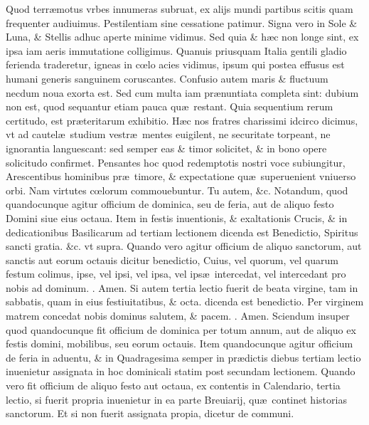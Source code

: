 \documentclass[a5paper,10pt]{book}
\def\ae{æ}
\def\oe{œ}
\begin{document}
\begin{multicols*}{2}
Quod terr\ae motus vrbes innumeras subruat, ex alijs mundi partibus scitis quam frequenter audiuimus.
Pestilentiam sine cessatione patimur.
Signa vero in Sole \& Luna, \& Stellis adhuc aperte minime vidimus.
Sed quia \& h\ae c non longe sint, ex ipsa iam aeris immutatione colligimus.
Quanuis priusquam Italia gentili gladio ferienda traderetur, igneas in c\oe lo acies vidimus, ipsum qui postea effusus est humani generis sanguinem coruscantes.
Confusio autem maris \& fluctuum necdum noua exorta est.
Sed cum multa iam pr\ae nuntiata completa sint: dubium non est, quod sequantur etiam pauca qu\ae \ restant.
Quia sequentium rerum certitudo, est pr\ae teritarum exhibitio.
H\ae c nos fratres charissimi idcirco dicimus, vt ad cautel\ae \ studium vestr\ae \ mentes euigilent, ne securitate torpeant, ne ignorantia languescant: sed semper eas \& timor solicitet, \& in bono opere solicitudo confirmet.
Pensantes hoc quod redemptotis nostri voce subiungitur, Arescentibus hominibus pr\ae \ timore, \& expectatione qu\ae \ superuenient vniuerso orbi.
Nam virtutes c\oe lorum commouebuntur.
Tu autem, \&c.
\newline {} \color{red} Notandum, quod quandocunque agitur officium de dominica, seu de feria, aut de aliquo festo Domini siue eius octaua. \color{black}
\newline {} \color{red} Item in festis inuentionis, \& exaltationis Crucis, \& in dedicationibus Basilicarum ad tertiam lectionem dicenda est Benedictio, \color{black} Spiritus sancti gratia. \color{red} \&c. vt supra. Quando vero agitur officium de aliquo sanctorum, aut sanctis aut eorum octauis dicitur benedictio, \color{black} Cuius, \color{red} vel \color{black} quorum, \color{red} vel \color{black} quarum festum colimus, ipse, \color{red} vel \color{black} ipsi, \color{red} vel \color{black} ipsa, \color{red} vel \color{black} ips\ae \ intercedat, \color{red} vel \color{black} intercedant pro nobis ad dominum. \color{red} \Rbar . \color{black} Amen.
\newline {} \color{red} Si autem tertia lectio fuerit de beata virgine, tam in sabbatis, quam in eius festiuitatibus, \& octa. dicenda est benedictio. \color{black} Per virginem matrem concedat nobis dominus salutem, \& pacem. \color{red} \Rbar . \color{black} Amen.
\newline {} \color{red} Sciendum insuper quod quandocunque fit officium de dominica per totum annum, aut de aliquo ex festis domini, mobilibus, seu eorum octauis. \color{black}
\newline {} \color{red} Item quandocunque agitur officium de feria in aduentu, \& in Quadragesima semper in pr\ae dictis diebus tertiam lectio inuenietur assignata in hoc dominicali statim post secundam lectionem. Quando vero fit officium de aliquo festo aut octaua, ex contentis in Calendario, tertia lectio, si fuerit propria inuenietur in ea parte Breuiarij, qu\ae \ continet historias sanctorum. Et si non fuerit assignata propia, dicetur de communi. \color{black}

\end{multicols*}
\end{document}
